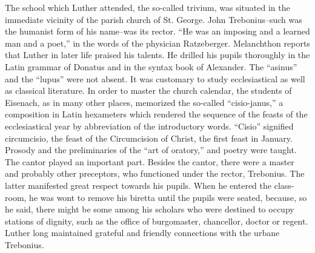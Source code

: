 The school which Luther attended, the so-called trivium, was
situated in the immediate vicinity of the parish church of St. George.
John Trebonius--such was the humanist form of his name--was its
rector. “He was an imposing and a learned man and a poet,” in the
words of the physician Ratzeberger. Melanchthon reports that Luther
in later life praised his talents. He drilled his pupils thoroughly in
the Latin grammar of Donatus and in the syntax book of Alexander.
The “asinus” and the “lupus” were not absent. It was customary to
study ecclesiastical as well as classical literature. In order to master
the church calendar, the students of Eisenach, as in many other places,
memorized the so-called “cisio-janus,” a composition in Latin hexameters which rendered the sequence of the feasts of the ecclesiastical
year by abbreviation of the introductory words. “Cisio” signified circumcisio, the feast of the Circumcision of Christ, the first feast
in January. Prosody and the preliminaries of the “art of oratory,” and
poetry were taught. The cantor played an important part. Besides
the cantor, there were a master and probably other preceptors, who
functioned under the rector, Trebonius. The latter manifested great
respect towards his pupils. When he entered the class-room, he was
wont to remove his biretta until the pupils were seated, because, so he
said, there might be some among his scholars who were destined to
occupy stations of dignity, such as the office of burgomaster, chancellor, doctor or regent. Luther long maintained grateful and friendly
connections with the urbane Trebonius.

